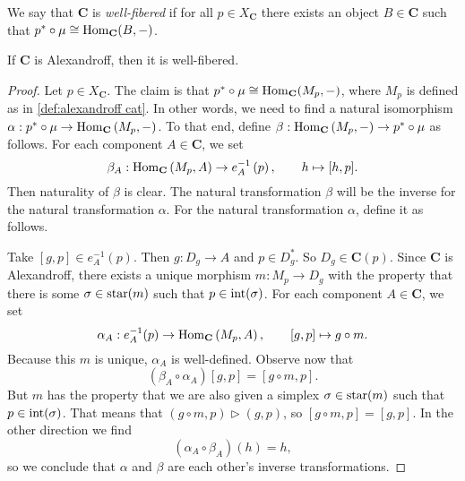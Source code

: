 \begin{definition*}
\label{def:well-fibered}
We say that $\mathbf{C}$ is \emph{well-fibered} if for all $p \in X_\mathbf{C}$ there exists an object $B \in \mathbf{C}$ such that $p^* \circ \operatorname{\mu} \cong \operatorname{Hom}_\mathbf{C}(B,-)$.
\end{definition*}

\begin{lemma*}
\label{lem:alexandroff implies well-fibered}
If $\mathbf{C}$ is Alexandroff, then it is well-fibered.
\end{lemma*}
\begin{proof}
Let $p \in X_{\mathbf{C}}$. The claim is that $p^* \circ \operatorname{\mu} \cong \operatorname{Hom}_{\mathbf{C}}(M_p,-)$, where $M_p$ is defined as in \cref{def:alexandroff cat}. In other words, we need to find a natural isomorphism $\alpha : p^* \circ \operatorname{\mu} \to \operatorname{Hom}_{\mathbf{C}}\left(M_p,-\right)$. To that end, define $\beta : \operatorname{Hom}_{\mathbf{C}}\left( M_p, - \right) \to p^* \circ \operatorname{\mu}$ as follows. For each component $A \in \mathbf{C}$, we set 
\[ \beta_A : \operatorname{Hom}_{\mathbf{C}}\left(M_p,A \right) \to e^{-1}_A\left(p \right), \qquad h \mapsto [h,p]. \]
Then naturality of $\beta$ is clear. The natural transformation $\beta$ will be the inverse for the natural transformation $\alpha$. For the natural transformation $\alpha$, define it as follows.

Take $[g,p] \in e^{-1}_A(p)$. 
Then $g : D_g \to A$ and $p \in D_g^*$. 
So $D_g \in \mathbf{C}(p)$. Since $\mathbf{C}$ is Alexandroff, there exists a unique morphism $m : M_p \to D_g$ with the property that there is some $\sigma \in \operatorname{star}(m)$ such that $p \in \operatorname{int}(\sigma)$. For each component $A \in \mathbf{C}$, we set
\[ \alpha_A : e^{-1}_A(p) \to \operatorname{Hom}_{\mathbf{C}}\left(M_p, A \right), \qquad [g,p] \mapsto g \circ m. \]
Because this $m$ is unique, $\alpha_A$ is well-defined. Observe now that
\[ \left(\beta_A \circ \alpha_A\right)[g,p] = [g \circ m, p]. \]
But $m$ has the property that we are also given a simplex $\sigma \in \operatorname{star}(m)$ such that $p \in \operatorname{int}(\sigma)$. That means that $(g \circ m,p) \rhd (g,p)$, so $[g \circ m,p] = [g,p]$. In the other direction we find
\[ \left(\alpha_A \circ \beta_A \right)(h) = h, \]
so we conclude that $\alpha$ and $\beta$ are each other's inverse transformations.
\end{proof}

